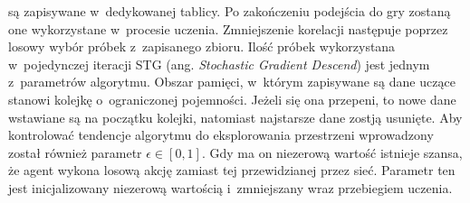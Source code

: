 są zapisywane w~dedykowanej tablicy. Po zakończeniu podejścia do gry zostaną one wykorzystane w~procesie uczenia. Zmniejszenie korelacji następuje poprzez losowy wybór próbek z~zapisanego zbioru. Ilość próbek wykorzystana w~pojedynczej iteracji STG (ang. \textit{Stochastic Gradient Descend}) jest jednym z~parametrów algorytmu. Obszar pamięci, w~którym zapisywane są dane uczące stanowi kolejkę o~ograniczonej pojemności. Jeżeli się ona przepeni, to nowe dane wstawiane są na początku kolejki, natomiast najstarsze dane zostją usunięte. Aby kontrolować tendencje algorytmu do eksplorowania przestrzeni wprowadzony został również parametr $\epsilon \in [0,1]$. Gdy ma on niezerową wartość istnieje szansa, że agent wykona losową akcję zamiast tej przewidzianej przez sieć. Parametr ten jest inicjalizowany niezerową wartością i~zmniejszany wraz przebiegiem uczenia.

